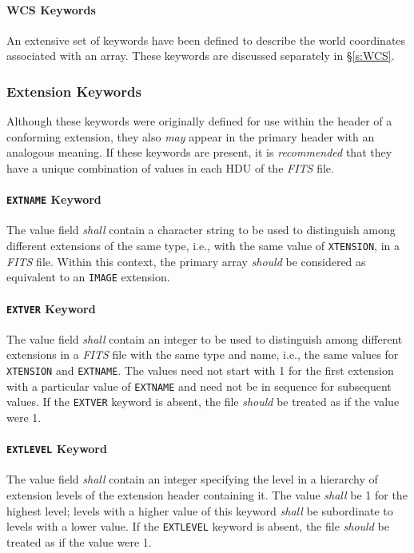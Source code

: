 \documentclass[11pt,makeidx]{book}     %
\begin{document}
\paragraph{WCS Keywords}
An extensive set of keywords have been defined to describe the world coordinates
associated with an array.  These keywords are discussed separately in 
\S\ref{s:WCS}.

\subsubsection{Extension Keywords}

 Although these keywords were originally defined for use within
 the header of a conforming extension, they also {\em may} appear in the primary header 
 with an analogous meaning.
 If these keywords are present, it is {\em recommended} that they have
 a unique combination of values in each HDU of the {\em FITS\/} file.

  
   \paragraph{{\tt EXTNAME} Keyword}
 The value field {\em shall} contain a character 
 string to be
 used to distinguish
 among different extensions of the same 
 type, i.e., with the same value of {\tt XTENSION}, 
 in a {\em FITS\/} file.  Within this context, the primary array {\em should}
 be considered as equivalent to an {\tt IMAGE} extension.
  
   \paragraph{{\tt EXTVER} Keyword}
 The value field {\em shall} contain an integer to be used to
 distinguish among different extensions in a {\em FITS\/} file
 with the same type and name, i.e., the same values for 
 {\tt XTENSION} and {\tt EXTNAME}. The
 values need not start with 1 for the first extension with
 a particular value of {\tt EXTNAME} and need not be in
 sequence for subsequent values. If the {\tt EXTVER} keyword
 is absent, the file {\em should} be treated as if the value
 were 1.
  
   \paragraph{{\tt EXTLEVEL} Keyword}
 The value field {\em shall} contain an integer specifying the
 level in a hierarchy of extension levels of the extension
 header containing it.  The value {\em shall} be 1 for the highest
 level; levels with a higher value of this keyword {\em shall} be
 subordinate to levels with a lower value. If the {\tt EXTLEVEL}
 keyword is absent, the file {\em should} be treated as if the
 value were 1.
  
\end{document}
